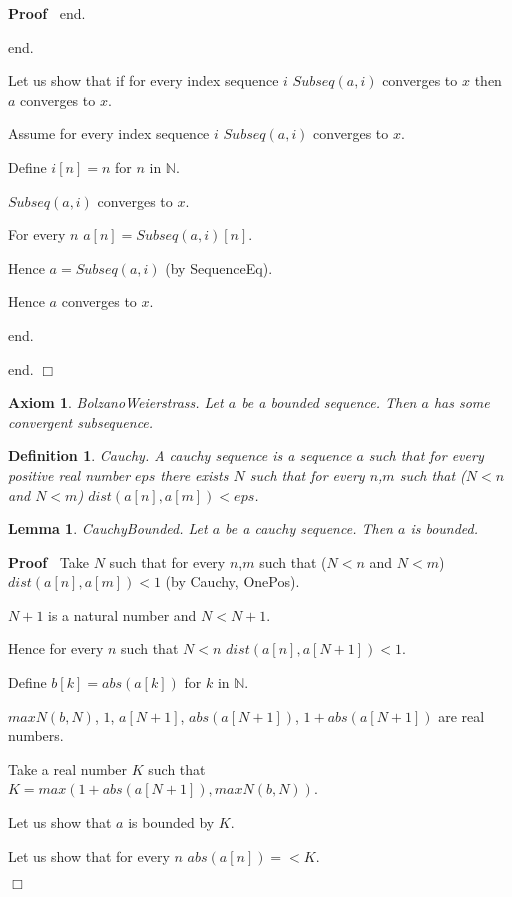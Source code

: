 \documentclass{article}
\newenvironment{forthel}{\begin{leftbar}}{\end{leftbar}}
\newenvironment{proof}{\noindent\textbf{Proof\ }}{\hspace*{\fill}$\Box$\medskip}
\newtheorem{axiom}{Axiom}
\newtheorem{lemma}{Lemma}
\newtheorem{definition}{Definition}
\newcommand{\NN}{\mathbb{N}}
\begin{document}
\begin{forthel}
\begin{proof}
				end.
				
			end.
		
		Let us show that if for every index sequence $i$ $Subseq(a,i)$ converges to $x$ then $a$ converges to $x$.
		
		Assume for every index sequence $i$ $Subseq(a,i)$ converges to $x$.
		
		Define $i[n] = n$ for $n$ in $\NN$.
		
		$Subseq(a,i)$ converges to $x$.
		
		For every $n$ $a[n] = Subseq(a,i)[n]$.
		
		Hence $a = Subseq(a,i)$ (by SequenceEq).
		
		Hence $a$ converges to $x$.
		
		end.
		
		end.
	\end{proof}


	\begin{axiom}
		BolzanoWeierstrass.
		Let $a$ be a bounded sequence. Then $a$ has some convergent subsequence.
	\end{axiom}
	
	\begin{definition}
		Cauchy.
		A cauchy sequence is a sequence $a$ such that for every positive real number $eps$ there exists $N$ such that
		for every $n$,$m$ such that ($N < n$ and $N < m$) $dist(a[n],a[m]) < eps$.
	\end{definition}
	
	\begin{lemma}
		CauchyBounded.
		Let $a$ be a cauchy sequence. Then $a$ is bounded.
	\end{lemma}
	\begin{proof}
		Take $N$ such that for every $n$,$m$ such that ($N < n$ and $N < m$) $dist(a[n],a[m]) < 1$ (by Cauchy, OnePos).
		
		$N + 1$ is a natural number and $N < N + 1$.
		
		Hence for every $n$ such that $N < n$ $dist(a[n],a[N + 1]) < 1$.
		
		Define $b[k] = abs(a[k])$ for $k$ in $\NN$.
		
		$maxN(b,N)$, $1$, $a[N + 1]$, $abs(a[N + 1])$, $1 + abs(a[N + 1])$ are real numbers.
		
		Take a real number $K$ such that $K = max(1 + abs(a[N + 1]), maxN(b,N))$.
		
		Let us show that $a$ is bounded by $K$.
		
		Let us show that for every $n$ $abs(a[n]) =< K$. 
		

\end{proof}
\end{forthel}
\end{document}
